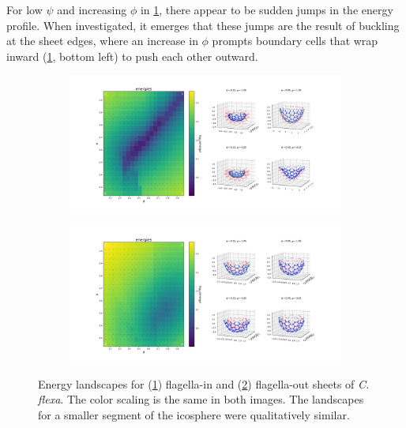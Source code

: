 For low $\psi$ and increasing $\phi$ in \cref{subfig:landscape_ico}, there appear to be sudden jumps in the energy profile. 
When investigated, it emerges that these jumps are the result of buckling at the sheet edges, where an increase in $\phi$ prompts boundary cells that wrap inward (\cref{subfig:landscape_ico}, bottom left) to push each other outward.

\begin{figure}
	\centering
	\begin{subfigure}[b]{\textwidth}
		\centering
		\includegraphics[width=\textwidth]{landscape_ico3.png}
		\caption{}
		\label{subfig:landscape_ico}
	\end{subfigure}
	\begin{subfigure}[b]{\textwidth}
		\centering
		\includegraphics[width=\textwidth]{landscape_ico3r.png}
		\caption{}
		\label{subfig:landscape_icor}
	\end{subfigure}
	\caption[Energy landscape for flagella-in and flagella-out curved sheets]{Energy landscapes for (\ref{subfig:landscape_ico}) flagella-in and (\ref{subfig:landscape_icor}) flagella-out sheets of \textit{C. flexa}. The color scaling is the same in both images. The landscapes for a smaller segment of the icosphere were qualitatively similar.}
	\label{fig:landscape_ico}
\end{figure}

